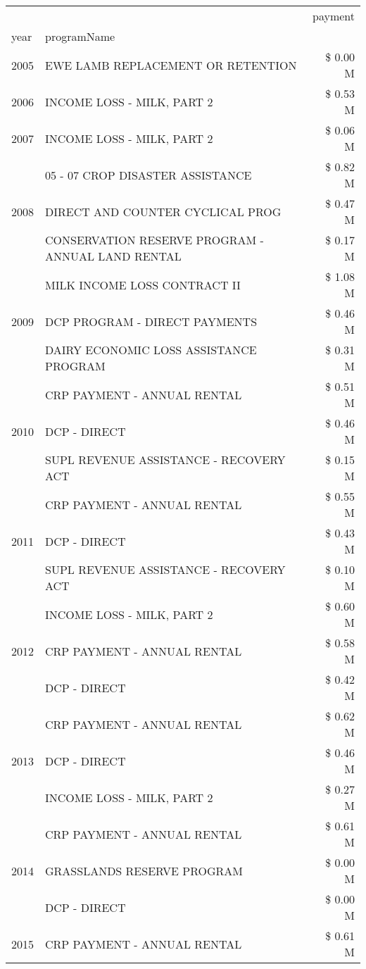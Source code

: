 \begin{tabular}{llr}
\toprule
 &  & payment \\
year & programName &  \\
\midrule
2005 & EWE LAMB REPLACEMENT OR RETENTION & \$ 0.00 M \\
\cline{1-3}
2006 & INCOME LOSS - MILK, PART 2 & \$ 0.53 M \\
\cline{1-3}
2007 & INCOME LOSS - MILK, PART 2 & \$ 0.06 M \\
\cline{1-3}
\multirow[t]{3}{*}{2008} & 05 - 07 CROP DISASTER ASSISTANCE & \$ 0.82 M \\
 & DIRECT AND COUNTER CYCLICAL PROG & \$ 0.47 M \\
 & CONSERVATION RESERVE PROGRAM - ANNUAL LAND RENTAL & \$ 0.17 M \\
\cline{1-3}
\multirow[t]{3}{*}{2009} & MILK INCOME LOSS CONTRACT II & \$ 1.08 M \\
 & DCP PROGRAM - DIRECT PAYMENTS & \$ 0.46 M \\
 & DAIRY ECONOMIC LOSS ASSISTANCE PROGRAM & \$ 0.31 M \\
\cline{1-3}
\multirow[t]{3}{*}{2010} & CRP PAYMENT - ANNUAL RENTAL & \$ 0.51 M \\
 & DCP - DIRECT & \$ 0.46 M \\
 & SUPL REVENUE ASSISTANCE - RECOVERY ACT & \$ 0.15 M \\
\cline{1-3}
\multirow[t]{3}{*}{2011} & CRP PAYMENT - ANNUAL RENTAL & \$ 0.55 M \\
 & DCP - DIRECT & \$ 0.43 M \\
 & SUPL REVENUE ASSISTANCE - RECOVERY ACT & \$ 0.10 M \\
\cline{1-3}
\multirow[t]{3}{*}{2012} & INCOME LOSS - MILK, PART 2 & \$ 0.60 M \\
 & CRP PAYMENT - ANNUAL RENTAL & \$ 0.58 M \\
 & DCP - DIRECT & \$ 0.42 M \\
\cline{1-3}
\multirow[t]{3}{*}{2013} & CRP PAYMENT - ANNUAL RENTAL & \$ 0.62 M \\
 & DCP - DIRECT & \$ 0.46 M \\
 & INCOME LOSS - MILK, PART 2 & \$ 0.27 M \\
\cline{1-3}
\multirow[t]{3}{*}{2014} & CRP PAYMENT - ANNUAL RENTAL & \$ 0.61 M \\
 & GRASSLANDS RESERVE PROGRAM & \$ 0.00 M \\
 & DCP - DIRECT & \$ 0.00 M \\
\cline{1-3}
\multirow[t]{3}{*}{2015} & CRP PAYMENT - ANNUAL RENTAL & \$ 0.61 M \\

\end{tabular}
